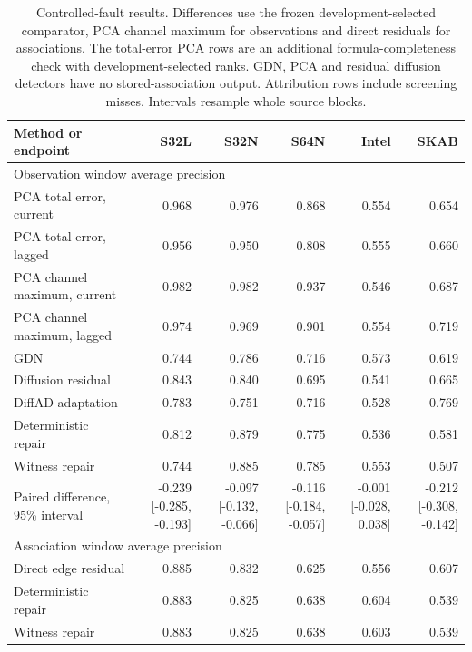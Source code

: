 \begin{table}[t]
\centering\small
\caption{Controlled-fault results. Differences use the frozen development-selected comparator, PCA channel maximum for observations and direct residuals for associations. The total-error PCA rows are an additional formula-completeness check with development-selected ranks. GDN, PCA and residual diffusion detectors have no stored-association output. Attribution rows include screening misses. Intervals resample whole source blocks.}\label{tab:main}
\begin{tabular}{lrrrrr}
\toprule
Method or endpoint & S32L & S32N & S64N & Intel & SKAB \\
\midrule
\multicolumn{6}{l}{Observation window average precision} \\
PCA total error, current & 0.968 & 0.976 & 0.868 & 0.554 & 0.654 \\
PCA total error, lagged & 0.956 & 0.950 & 0.808 & 0.555 & 0.660 \\
PCA channel maximum, current & 0.982 & 0.982 & 0.937 & 0.546 & 0.687 \\
PCA channel maximum, lagged & 0.974 & 0.969 & 0.901 & 0.554 & 0.719 \\
GDN & 0.744 & 0.786 & 0.716 & 0.573 & 0.619 \\
Diffusion residual & 0.843 & 0.840 & 0.695 & 0.541 & 0.665 \\
DiffAD adaptation & 0.783 & 0.751 & 0.716 & 0.528 & 0.769 \\
Deterministic repair & 0.812 & 0.879 & 0.775 & 0.536 & 0.581 \\
Witness repair & 0.744 & 0.885 & 0.785 & 0.553 & 0.507 \\
Paired difference, 95\% interval & \shortstack{-0.239\\{}[-0.285, -0.193]} & \shortstack{-0.097\\{}[-0.132, -0.066]} & \shortstack{-0.116\\{}[-0.184, -0.057]} & \shortstack{-0.001\\{}[-0.028, 0.038]} & \shortstack{-0.212\\{}[-0.308, -0.142]} \\
\midrule
\multicolumn{6}{l}{Association window average precision} \\
Direct edge residual & 0.885 & 0.832 & 0.625 & 0.556 & 0.607 \\
Deterministic repair & 0.883 & 0.825 & 0.638 & 0.604 & 0.539 \\
Witness repair & 0.883 & 0.825 & 0.638 & 0.603 & 0.539 \\

\end{tabular}
\end{table}
